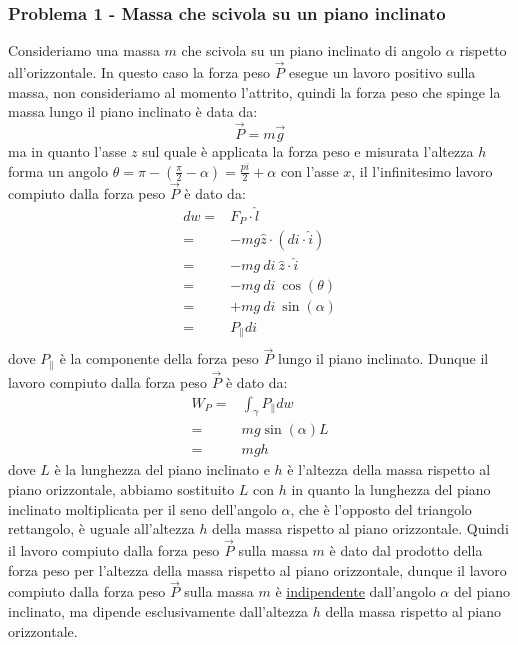         \subsubsection{Problema 1 - Massa che scivola su un piano inclinato}
            Consideriamo una massa $m$ che scivola su un piano inclinato di angolo $\alpha$ rispetto all'orizzontale.\newline
            In questo caso la forza peso $\vec{P}$ esegue un lavoro positivo sulla massa, non consideriamo al momento l'attrito, quindi la forza peso che spinge la massa lungo il piano inclinato è data da:
            $$
                \vec{P} = m\vec{g}
            $$
            ma in quanto l'asse $z$ sul quale è applicata la forza peso e misurata l'altezza $h$ forma un angolo $\theta=\pi-\left(\frac{\pi}2-\alpha\right) = \frac{pi}{2}+\alpha$ con l'asse $x$, il l'infinitesimo lavoro compiuto dalla forza peso $\vec{P}$ è dato da:
            $$
                \begin{aligned}
                    dw=& F_{P} \cdot \hat{l} \\
                    =& -mg\hat{z} \cdot (di\cdot \hat{i})\\
                    =& -mg\ di\ \hat{z} \cdot \hat{i}\\
                    =& -mg\ di\ \cos(\theta)\\
                    =& +mg\ di\ \sin(\alpha)\\
                    =& P_{\parallel} di\\
                \end{aligned}
            $$
            dove $P_{\parallel}$ è la componente della forza peso $\vec{P}$ lungo il piano inclinato. Dunque il lavoro compiuto dalla forza peso $\vec{P}$ è dato da:
            $$
                \begin{aligned}
                    W_{P} =& \int_{\gamma} P_{\parallel} dw\\
                    =& mg\sin(\alpha) L\\
                    =& mg h
                \end{aligned}
            $$
            dove $L$ è la lunghezza del piano inclinato e $h$ è l'altezza della massa rispetto al piano orizzontale, abbiamo sostituito $L$ con $h$ in quanto la lunghezza del piano inclinato moltiplicata per il seno dell'angolo $\alpha$, che è l'opposto del triangolo rettangolo, è uguale all'altezza $h$ della massa rispetto al piano orizzontale. Quindi il lavoro compiuto dalla forza peso $\vec{P}$ sulla massa $m$ è dato dal prodotto della forza peso per l'altezza della massa rispetto al piano orizzontale, dunque il lavoro compiuto dalla forza peso $\vec{P}$ sulla massa $m$ è \underline{indipendente} dall'angolo $\alpha$ del piano inclinato, ma dipende esclusivamente dall'altezza $h$ della massa rispetto al piano orizzontale.
